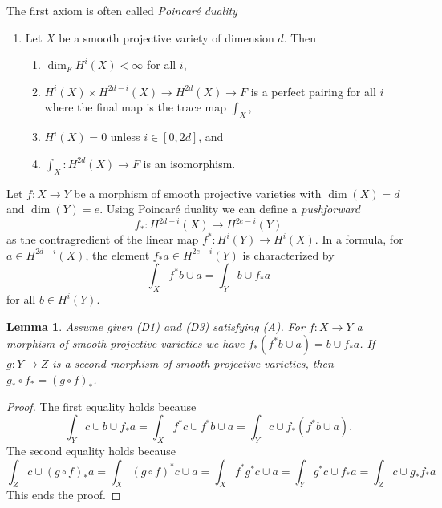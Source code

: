 \documentclass{stacks-project}
\theoremstyle{plain}
\newtheorem{lemma}[subsection]{Lemma}
\theoremstyle{definition}
\theoremstyle{remark}
\numberwithin{equation}{subsection}
\begin{document}
\medskip\noindent
The first axiom is often called {\it Poincar\'e duality}
\begin{enumerate}
\item[(A)] Let $X$ be a smooth projective variety of dimension $d$. Then
\begin{enumerate}
\item $\dim_F H^i(X) < \infty$ for all $i$,
\item $H^i(X) \times H^{2d - i}(X) \rightarrow H^{2d}(X) \rightarrow F$
is a perfect pairing for all $i$ where the final
map is the trace map $\int_X$,
\item $H^i(X) = 0$ unless $i \in [0, 2d]$, and
\item $\int_X : H^{2d}(X) \to F$ is an isomorphism.
\end{enumerate}
\end{enumerate}
Let $f : X \to Y$ be a morphism of smooth projective varieties
with $\dim(X) = d$ and $\dim(Y) = e$. Using Poincar\'e duality
we can define a {\it pushforward}
$$
f_* : H^{2d - i}(X) \longrightarrow H^{2e - i}(Y)
$$
as the contragredient of the linear map $f^* : H^i(Y) \to H^i(X)$. In a
formula, for $a \in H^{2d - i}(X)$, the element $f_*a \in H^{2e - i}(Y)$
is characterized by
$$
\int_X f^*b \cup a = \int_Y b \cup f_*a
$$
for all $b \in H^i(Y)$.

\begin{lemma}
\label{lemma-pushforward-classical}
Assume given (D1) and (D3) satisfying (A). For $f : X \to Y$
a morphism of smooth projective varieties we have
$f_*(f^*b \cup a) = b \cup f_*a$. If $g : Y \to Z$ is a second morphism
of smooth projective varieties, then $g_* \circ f_* = (g \circ f)_*$.
\end{lemma}

\begin{proof}
The first equality holds because
$$
\int_Y c \cup b \cup f_*a =
\int_X f^*c \cup f^*b \cup a =
\int_Y c \cup f_*(f^*b \cup a).
$$
The second equality holds because
$$
\int_Z c \cup (g \circ f)_*a = \int_X (g \circ f)^*c \cup a =
\int_X f^* g^* c \cup a = \int_Y g^*c \cup f_*a = \int_Z c \cup g_*f_*a
$$
This ends the proof.
\end{proof}
\end{document}
